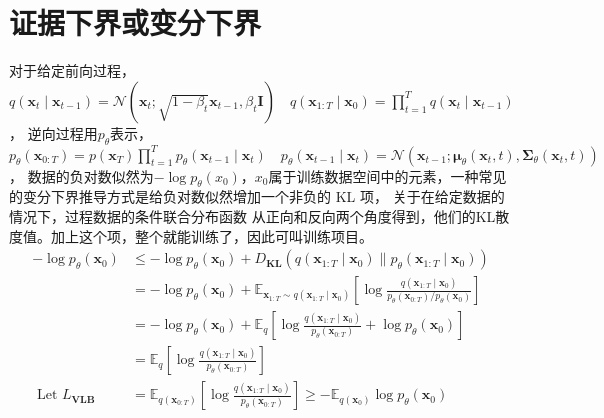 


\section{证据下界或变分下界}
对于给定前向过程，
$q\left(\mathbf{x}_t \mid \mathbf{x}_{t-1}\right)=\mathcal{N}\left(\mathbf{x}_t ; \sqrt{1-\beta_t} \mathbf{x}_{t-1}, 
\beta_t \mathbf{I}\right) \quad q\left(\mathbf{x}_{1: T} \mid \mathbf{x}_0\right)=
\prod_{t=1}^T q\left(\mathbf{x}_t \mid \mathbf{x}_{t-1}\right)$，
逆向过程用$p_{\theta}$表示，
$p_\theta\left(\mathbf{x}_{0: T}\right)=p\left(\mathbf{x}_T\right) 
\prod_{t=1}^T p_\theta\left(\mathbf{x}_{t-1} \mid \mathbf{x}_t\right) \quad p_\theta\left(\mathbf{x}_{t-1} \mid \mathbf{x}_t\right)=
\mathcal{N}\left(\mathbf{x}_{t-1} ; 
\boldsymbol{\mu}_\theta\left(\mathbf{x}_t, t\right), \mathbf{\Sigma}_\theta\left(\mathbf{x}_t, t\right)\right)
$，
数据的负对数似然为$-\log p_{\theta}(x_0)$，$x_0$属于训练数据空间中的元素，一种常见的变分下界推导方式是给负对数似然增加一个非负的 KL 项，
关于在给定数据的情况下，过程数据的条件联合分布函数 从正向和反向两个角度得到，他们的KL散度值。加上这个项，整个就能训练了，因此可叫训练项目。
\begin{equation}
  \begin{aligned}
    -\log p_\theta\left(\mathbf{x}_0\right) 
    & \leq-\log p_\theta\left(\mathbf{x}_0\right)+D_{\mathbf{KL}}\left(q\left(\mathbf{x}_{1: T} \mid \mathbf{x}_0\right) \| p_\theta\left(\mathbf{x}_{1: T} \mid \mathbf{x}_0\right)\right) \\ 
    & =-\log p_\theta\left(\mathbf{x}_0\right)+\mathbb{E}_{\mathbf{x}_{1: T} \sim q\left(\mathbf{x}_{1: T} \mid \mathbf{x}_0\right)}\left[\log \frac{q\left(\mathbf{x}_{1: T} 
    \mid \mathbf{x}_0\right)}{p_\theta\left(\mathbf{x}_{0: T}\right) / p_\theta\left(\mathbf{x}_0\right)}\right] \\ 
    & =-\log p_\theta\left(\mathbf{x}_0\right)+\mathbb{E}_q\left[\log \frac{q\left(\mathbf{x}_{1: T} \mid \mathbf{x}_0\right)}{p_\theta\left(\mathbf{x}_{0: T}\right)}+\log p_\theta\left(\mathbf{x}_0\right)\right] \\ 
    & =\mathbb{E}_q\left[\log \frac{q\left(\mathbf{x}_{1: T} \mid \mathbf{x}_0\right)}{p_\theta\left(\mathbf{x}_{0: T}\right)}\right] \\ \text { Let } L_{\mathbf{VLB}} & =\mathbb{E}_{q\left(\mathbf{x}_{0: T}\right)}
    \left[\log \frac{q\left(\mathbf{x}_{1: T} \mid \mathbf{x}_0\right)}{p_\theta\left(\mathbf{x}_{0: T}\right)}\right] 
    \geq-\mathbb{E}_{q\left(\mathbf{x}_0\right)} \log p_\theta\left(\mathbf{x}_0\right)
  \end{aligned}
\end{equation}

